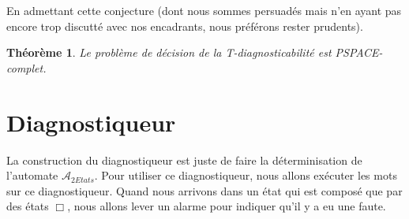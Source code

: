 \documentclass[conference]{IEEEtran}
\newtheorem{myth}{Th\'eor\`eme}
\begin{document}
En admettant cette conjecture (dont nous sommes persuadés mais n'en ayant pas encore trop discutté avec nos encadrants, nous préférons rester prudents).
\begin{myth}
Le problème de décision de la T-diagnosticabilité est PSPACE-complet.
\end{myth}



\section{Diagnostiqueur}

La construction du diagnostiqueur est juste de faire la d\'eterminisation de l'automate $\mathcal{A}_{2Etats}$. Pour utiliser ce diagnostiqueur, nous allons ex\'ecuter les mots sur ce diagnostiqueur. Quand nous arrivons dans un \'etat qui est compos\'e que par des \'etats $\Box$, nous allons lever un alarme pour indiquer qu'il y a eu une faute.


%
%



%
%
\end{document}
